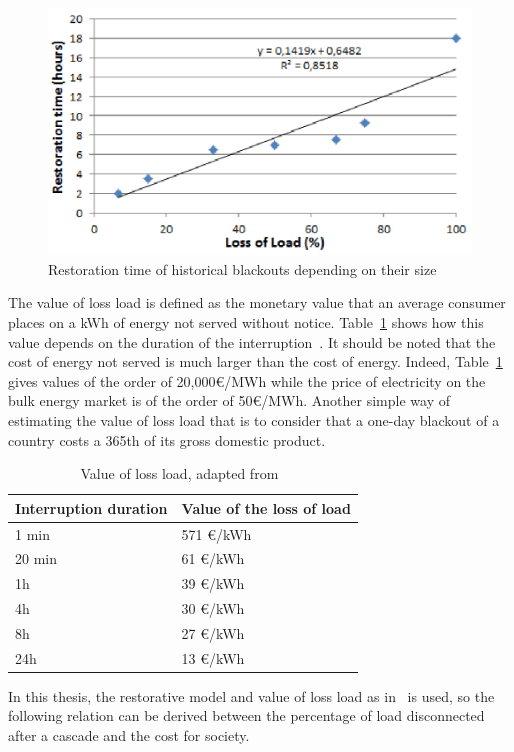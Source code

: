 \begin{figure}
    \centering
    \includegraphics[width=0.6\linewidth]{Figs/RestorationTime.png}
    \caption{Restoration time of historical blackouts depending on their size~\cite{TwoLevelPSA}}
    \label{fig:restoration_time}
\end{figure}

The value of loss load is defined as the monetary value that an average consumer places on a kWh of energy not served without notice. Table~\ref{tab:VOLL} shows how this value depends on the duration of the interruption~\cite{VOLL}. It should be noted that the cost of energy not served is much larger than the cost of energy. Indeed, Table~\ref{tab:VOLL} gives values of the order of 20,000€/MWh while the price of electricity on the bulk energy market is of the order of 50€/MWh. Another simple way of estimating the value of loss load that is to consider that a one-day blackout of a country costs a 365th of its gross domestic product.

\begin{table}
    \centering
    \caption{Value of loss load, adapted from~\cite{VOLL}}
    \label{tab:VOLL}
    \begin{tabular}{@{}ll@{}}
    \toprule
    Interruption duration & Value of the loss of load \\ \midrule
    1 min  & 571 €/kWh \\
    20 min & 61 €/kWh \\
    1h     & 39 €/kWh \\
    4h     & 30 €/kWh \\
    8h     & 27 €/kWh \\
    24h    & 13 €/kWh \\ \bottomrule
    \end{tabular}
\end{table}

In this thesis, the restorative model and value of loss load as in~\cite{TwoLevelPSA} is used, so the following relation can be derived between the percentage of load disconnected after a cascade and the cost for society.

